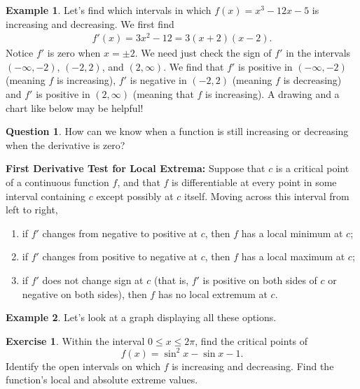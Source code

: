 \documentclass[leqno]{article}
\theoremstyle{definition}
\newtheorem{example}{Example}[section]
\newtheorem{question}{Question}[section]
\newtheorem{exercise}{Exercise}[section]
\theoremstyle{remark}
\theoremstyle{theorem}
\begin{document}
\begin{example}
Let's find which intervals in which $f(x)=x^3-12x-5$ is increasing and decreasing. We first find
\begin{align*}
f'(x)=3x^2-12=3(x+2)(x-2).
\end{align*}
Notice $f'$ is zero when $x=\pm 2$.  We need just check the sign of $f'$ in the intervals $(-\infty,-2)$, $(-2,2)$, and $(2,\infty)$. We find that $f'$ is positive in $(-\infty, -2)$ (meaning $f$ is increasing), $f'$ is negative in $(-2,2)$ (meaning $f$ is decreasing) and $f'$ is positive in $(2,\infty)$ (meaning that $f$ is increasing). A drawing and a chart like below may be helpful!
\vspace*{7cm}\\ 
\end{example}

\begin{question}
How can we know when a function is still increasing or decreasing when the derivative is zero?
\vspace*{2cm}\\
\end{question}

\noindent\textbf{First Derivative Test for Local Extrema:} Suppose that $c$ is a critical point of a continuous function $f$, and that $f$ is differentiable at every point in some interval containing $c$ except possibly at $c$ itself. Moving across this interval from left to right,
\begin{enumerate}[1.]
\item if $f'$ changes from negative to positive at $c$, then $f$ has a local minimum at $c$;
\item if $f'$ changes from positive to negative at $c$, then $f$ has a local maximum at $c$;
\item if $f'$ does not change sign at $c$ (that is, $f'$ is positive on both sides of $c$ or negative on both sides), then $f$ has no local extremum at $c$.
\end{enumerate}

\begin{example}
Let's look at a graph displaying all these options.
\vspace*{7cm}\\
\end{example}

\begin{exercise}
Within the interval $0\leq x \leq 2\pi$, find the critical points of 
\[
f(x)=\sin^2 x - \sin x -1.
\]
Identify the open intervals on which $f$ is increasing and decreasing. Find the function's local and absolute extreme values.
\vspace*{7cm}\\
\end{exercise}
\end{document}

